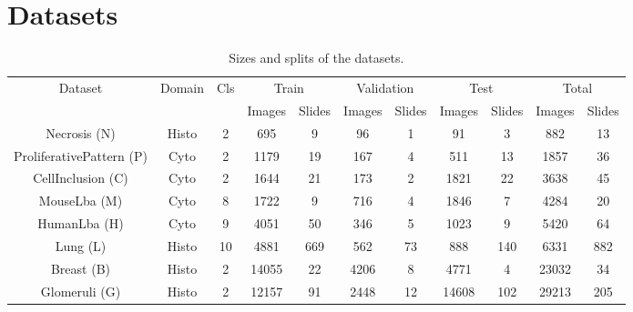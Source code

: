 \section{Datasets}
\label{sec:comp:datasets}


\begin{table*}
    \center 
    \begin{tabular}{|c|c|c||cc|cc|cc||cc|}
        \hline
        \multirow{2}{*}{Dataset} & \multirow{2}{*}{Domain} & \multirow{2}{*}{Cls} & \multicolumn{2}{c|}{Train} & \multicolumn{2}{c|}{Validation} & \multicolumn{2}{c||}{Test} & \multicolumn{2}{c|}{Total} \\
        \cline{4-11}
        & & & Images & Slides & Images & Slides & Images & Slides & Images & Slides \\
        \hline
        Necrosis (N) & Histo & 2 & 695 & 9 & 96 & 1 & 91 & 3 & 882 & 13 \\ %
        ProliferativePattern (P) & Cyto & 2 & 1179 & 19 & 167 & 4 & 511 & 13 & 1857 & 36 \\ %
        CellInclusion (C) & Cyto & 2 & 1644 & 21 & 173 & 2 & 1821 & 22 & 3638 & 45 \\ %
        MouseLba  (M) & Cyto & 8 & 1722 & 9 & 716 & 4 & 1846 & 7 & 4284 & 20 \\ %
        HumanLba (H) & Cyto & 9 & 4051 & 50 & 346 & 5 & 1023 & 9 & 5420 & 64 \\ %
        Lung (L) & Histo & 10 & 4881 & 669 & 562 & 73 & 888 & 140 & 6331 & 882 \\ %
        Breast (B) & Histo & 2 & 14055 & 22 & 4206 & 8 & 4771 & 4 & 23032 & 34 \\ %
        Glomeruli (G) \parencite{maree2016approach} & Histo & 2  & 12157 & 91 & 2448 & 12 & 14608 & 102 & 29213 & 205 \\ %
        \hline
    \end{tabular}
    \caption{Sizes and splits of the datasets.}
    \label{tab:comp:dataset_information}
\end{table*}


